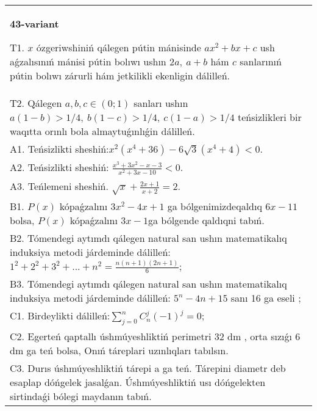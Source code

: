 \documentclass{article}
\begin{document}
\begin{tabular}{m{17cm}}
\textbf{43-variant}
\newline

T1. \(x\) ózgeriwshiniń qálegen pútin mánisinde \(ax^{2} + bx + c\) ush aǵzalısınıń mánisi pútin bolıwı ushın \(2a,\ a + b\) hám \(c\) sanlarınıń pútin bolıwı zárurli hám jetkilikli ekenligin dálilleń. \\
T2. Qálegen \(a,b,c \in (0;1)\) sanları ushın \(a(1 - b) > 1/4,\ b(1 - c) > 1/4,\ c(1 - a) > 1/4\) teńsizlikleri bir waqıtta orınlı bola almaytuǵınlıǵin dálilleń. \\
A1. Teńsizlikti sheshiń:\(x^{2}\left( x^{4} + 36 \right) - 6\sqrt{3}\left( x^{4} + 4 \right) < 0\). \\
A2. Teńsizlikti sheshiń: \(\frac{x^{3} + 3x^{2} - x - 3}{x^{2} + 3x - 10} < 0\). \\
A3. Teńlemeni sheshiń. \(\sqrt{x} + \frac{2x + 1}{x + 2} = 2\). \\
B1. \(P(x)\) kópaǵzalını \(3x^{2} - 4x + 1\) ga bólgenimizdeqaldıq \(6x - 11\) bolsa, \(P(x)\) kópaǵzalını \(3x - 1\)ga bólgende qaldıqni tabıń. \\
B2. Tómendegi aytımdı qálegen natural san ushın matematikalıq induksiya metodi járdeminde dálilleń: \(1^{2} + 2^{2} + 3^{2} + ... + n^{2} = \frac{n(n + 1)(2n + 1)}{6}\); \\
B3. Tómendegi aytımdı qálegen natural san ushın matematikalıq induksiya metodi járdeminde dálilleń: \(5^{n} - 4n + 15\) sanı 16 ga eseli ; \\
C1. Birdeylikti dálilleń:\(\sum_{j = 0}^{n}C_{n}^{j}( - 1)^{j} = 0\); \\
C2. Egerteń qaptallı úshmúyeshliktiń perimetri 32 dm , orta sızıǵı 6 dm ga teń bolsa, Onıń táreplari uzınlıqları tabılsın. \\
C3. Durıs úshmúyeshliktiń tárepi a ga teń. Tárepini diametr deb esaplap dóńgelek jasalǵan. Úshmúyeshliktiń usı dóńgelekten sirtindaǵi bólegi maydanın tabıń. \\

\end{tabular}
\vspace{1cm}
\end{document}
